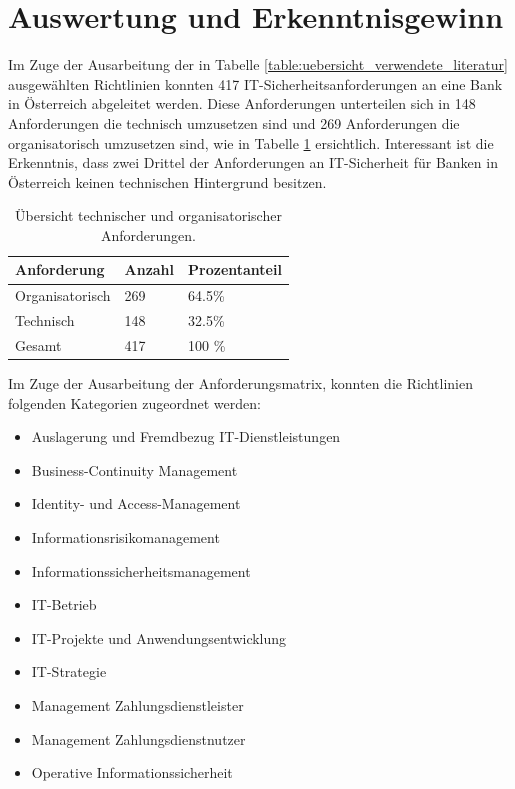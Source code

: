 \section{Auswertung und Erkenntnisgewinn}
Im Zuge der Ausarbeitung der in Tabelle \ref{table:uebersicht_verwendete_literatur} ausgewählten Richtlinien konnten 417 IT-Sicherheitsanforderungen an eine Bank in Österreich abgeleitet werden. Diese Anforderungen unterteilen sich in 148 Anforderungen die technisch umzusetzen sind und 269 Anforderungen die organisatorisch umzusetzen sind, wie in Tabelle \ref{table:anforderungen_vergleich} ersichtlich. Interessant ist die Erkenntnis, dass zwei Drittel der Anforderungen an IT-Sicherheit für Banken in Österreich keinen technischen Hintergrund besitzen.
\bigbreak
\begin{table}[H]
    \centering
    \caption{Übersicht technischer und organisatorischer Anforderungen.} 
    \begin{tabular}{lll}
        \hline
        Anforderung & Anzahl & Prozentanteil \\
        \hline\hline
        Organisatorisch & 269 & 64.5\%\\
        Technisch & 148 & 32.5\%\\
        \hline
        Gesamt & 417 & 100 \%
    \end{tabular}
    \label{table:anforderungen_vergleich}
\end{table}
\bigbreak
Im Zuge der Ausarbeitung der Anforderungsmatrix, konnten die Richtlinien folgenden Kategorien zugeordnet werden:
\begin{itemize}
    \item Auslagerung und Fremdbezug IT-Dienstleistungen
    \item Business-Continuity Management
    \item Identity- und Access-Management
    \item Informationsrisikomanagement
    \item Informationssicherheitsmanagement
    \item IT-Betrieb
    \item IT-Projekte und Anwendungsentwicklung
    \item IT-Strategie
    \item Management Zahlungsdienstleister
    \item Management Zahlungsdienstnutzer
    \item Operative Informationssicherheit
\end{itemize}
\bigbreak
